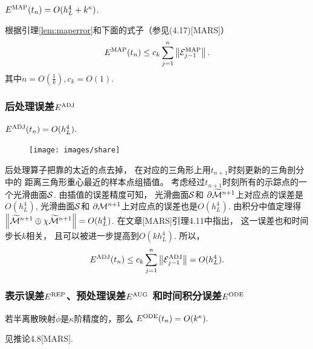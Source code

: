 \begin{prop}\label{lem:e_map}
  $E^{\textmd{MAP}}(t_n)=O(h_L^4+k^\kappa)$.
\end{prop}
\begin{pro}
根据引理\ref{lem:maperror}和下面的式子（参见(4.17)[MARS]）
\begin{equation}
  E^{\textmd{MAP}}(t_n)\leq c_k\sum_{j=1}^{n}\left\lVert
    {\cal E}^\textmd{MAP}_{j-1}\right \rVert.
\end{equation}
其中$n=O\left(\frac{1}{k}\right),c_k=O(1).$
  
\end{pro}

\subsubsection{后处理误差$E^{\textmd{ADJ}}$}


\begin{prop}
  $E^{\textmd{ADJ}}(t_n)=O(h_L^4).$
\end{prop}
\begin{pro}
  \begin{figure}[H]
    \centering
    \texttt{[image: images/share]}
    \label{fig:share}
  \end{figure}
 后处理算子把靠的太近的点去掉，
 在对应的三角形上用$t_{n+1}$时刻更新的三角剖分中的
 距离三角形重心最近的样本点组插值。
 考虑经过$t_{n+1}$时刻所有的示踪点的一个光滑曲面${\cal S}$.
 由插值的误差精度可知，
 光滑曲面${\cal S}$和
 $\partial\widetilde{{\cal M}}^{n+1}$上对应点的误差是$O(h_L^4)$,
  光滑曲面${\cal S}$和
  $\partial{\cal M}^{n+1}$上对应点的误差也是$O(h_L^4).$
  由积分中值定理得$\left\lVert\widetilde{{\cal M}}^{n+1}\oplus \chi
  \widetilde{{\cal M}}^{n+1}\right\rVert=O(h_L^4)$.
在文章[MARS]引理4.11\cite{zhang2016mars}中指出，
这一误差也和时间步长$k$相关，
且可以被进一步提高到$O(kh_L^4).$
所以，
\begin{equation}
  E^{\textmd{ADJ}}(t_n)\leq c_k\sum_{j=1}^{n}\left\lVert
    {\cal E}^\textmd{ADJ}_{j-1}\right \rVert=O(h_L^4).
\end{equation}
\end{pro}

\subsubsection{表示误差$E^\textmd{REP}$、预处理误差$E^\textmd{AUG}$
  和时间积分误差$E^\textmd{ODE}$}
\label{sec:rep,aug,ode}
\begin{prop}
  若半离散映射$\mathring{\phi}$是$\kappa$阶精度的，那么
  $E^{\textmd{ODE}}(t_n)=O(k^\kappa).$
\end{prop}
\begin{pro}
  见推论4.8[MARS]\cite{zhang2016mars}.
\end{pro}

